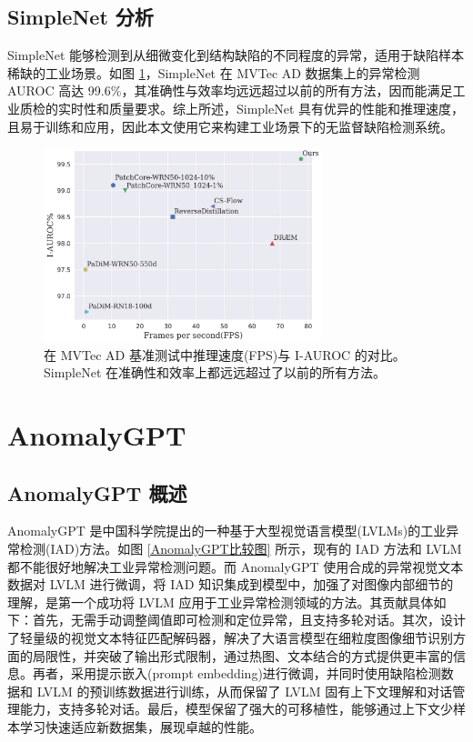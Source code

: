 \documentclass[
  ]{njuthesis}
\begin{document}
\subsection{SimpleNet 分析}

SimpleNet 能够检测到从细微变化到结构缺陷的不同程度的异常，适用于缺陷样本稀缺的工业场景。如图 \ref{MVTec基准测试结果}，SimpleNet 在 MVTec AD 数据集上的异常检测 AUROC 高达 99.6\%，其准确性与效率均远远超过以前的所有方法，因而能满足工业质检的实时性和质量要求。综上所述，SimpleNet 具有优异的性能和推理速度，且易于训练和应用，因此本文使用它来构建工业场景下的无监督缺陷检测系统。

\begin{figure}[ht]
    \centering
    \includegraphics[width=0.72\textwidth]{images/MVTec基准测试结果.png}
    \caption{在 MVTec AD 基准测试中推理速度(FPS)与 I-AUROC 的对比。SimpleNet 在准确性和效率上都远远超过了以前的所有方法。}
    \label{MVTec基准测试结果}
\end{figure}

\section{AnomalyGPT}

\subsection{AnomalyGPT 概述}

AnomalyGPT\cite{[10]} 是中国科学院提出的一种基于大型视觉语言模型(LVLMs)的工业异常检测(IAD)方法。如图 \ref{AnomalyGPT比较图} 所示，现有的 IAD 方法和 LVLM 都不能很好地解决工业异常检测问题。而 AnomalyGPT 使用合成的异常视觉文本数据对 LVLM 进行微调，将 IAD 知识集成到模型中，加强了对图像内部细节的理解，是第一个成功将 LVLM 应用于工业异常检测领域的方法。其贡献具体如下：首先，无需手动调整阈值即可检测和定位异常，且支持多轮对话。其次，设计了轻量级的视觉文本特征匹配解码器，解决了大语言模型在细粒度图像细节识别方面的局限性，并突破了输出形式限制，通过热图、文本结合的方式提供更丰富的信息。再者，采用提示嵌入(prompt embedding)进行微调，并同时使用缺陷检测数据和 LVLM 的预训练数据进行训练，从而保留了 LVLM 固有上下文理解和对话管理能力，支持多轮对话。最后，模型保留了强大的可移植性，能够通过上下文少样本学习快速适应新数据集，展现卓越的性能。
\end{document}
